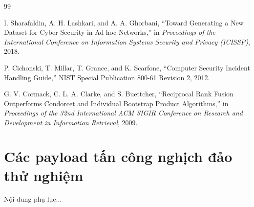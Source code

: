 \documentclass[12pt,a4paper]{report}
\begin{document}
\newpage
{}
\setcounter{page}{1}
\singlespacing %

\begin{thebibliography}{99}

I. Sharafaldin, A. H. Lashkari, and A. A. Ghorbani, ``Toward Generating a New Dataset for Cyber Security in Ad hoc Networks,'' in \textit{Proceedings of the International Conference on Information Systems Security and Privacy (ICISSP)}, 2018.

P. Cichonski, T. Millar, T. Grance, and K. Scarfone, ``Computer Security Incident Handling Guide,'' NIST Special Publication 800-61 Revision 2, 2012.

G. V. Cormack, C. L. A. Clarke, and S. Buettcher, ``Reciprocal Rank Fusion Outperforms Condorcet and Individual Bootstrap Product Algorithms,'' in \textit{Proceedings of the 32nd International ACM SIGIR Conference on Research and Development in Information Retrieval}, 2009.

\end{thebibliography}

\newpage
{}
\setcounter{page}{1}
\doublespacing

\appendix
\chapter{Các payload tấn công nghịch đảo thử nghiệm}
Nội dung phụ lục...
\end{document}
